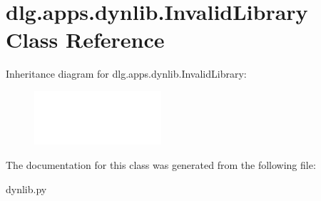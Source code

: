 \hypertarget{classdlg_1_1apps_1_1dynlib_1_1_invalid_library}{}\section{dlg.\+apps.\+dynlib.\+Invalid\+Library Class Reference}
\label{classdlg_1_1apps_1_1dynlib_1_1_invalid_library}
Inheritance diagram for dlg.\+apps.\+dynlib.\+Invalid\+Library\+:\begin{figure}[H]
\begin{center}
\leavevmode
\includegraphics[height=2.000000cm]{classdlg_1_1apps_1_1dynlib_1_1_invalid_library}
\end{center}
\end{figure}


The documentation for this class was generated from the following file\+:\begin{DoxyCompactItemize}
\item 
dynlib.\+py\end{DoxyCompactItemize}
